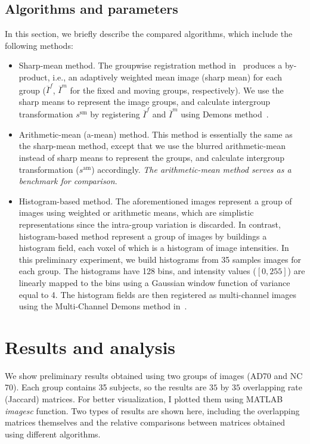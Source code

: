\documentclass[preprint,review,12pt]{elsarticle}
\newcommand{\ie}{{i.e., }}
\begin{document}
\subsection{Algorithms and parameters}
	In this section, we briefly describe the compared algorithms, which include the following methods:
	\begin{itemize}
		\item Sharp-mean method. The groupwise registration method in~\cite{Wu20111968} produces a by-product, \ie an adaptively weighted mean image (sharp mean) for each group ($\overline{I}^f$, $\overline{I}^m$ for the fixed and moving groups, respectively). We use the sharp means to represent the image groups, and calculate intergroup transformation $s^{\text{sm}}$ by registering $\overline{I}^f$ and $\overline{I}^m$ using Demons method~\cite{Vercauteren2009S61}.
		
		\item Arithmetic-mean (a-mean) method. This method is essentially the same as the sharp-mean method, except that we use the blurred arithmetic-mean instead of sharp means to represent the groups, and calculate intergroup transformation ($s^{\text{am}}$) accordingly. {\it The arithmetic-mean method serves as a benchmark for comparison}.
		
		\item Histogram-based method. The aforementioned images represent a group of images using weighted or arithmetic means, which are simplistic representations since the intra-group variation is discarded. In contrast, histogram-based method represent a group of images by buildings a histogram field, each voxel of which is a histogram of image intensities. In this preliminary experiment, we build histograms from 35 samples images for each group. The histograms have 128 bins, and intensity values ($[0,255]$) are linearly mapped to the bins using a Gaussian window function of variance equal to 4. The histogram fields are then registered as multi-channel images using the Multi-Channel Demons method in~\cite{peyrat_multichannel_demons}.
	\end{itemize}
	
\section{Results and analysis}

We show preliminary results obtained using two groups of images (AD70 and NC 70). Each group contains 35 subjects, so the results are $35$ by $35$ overlapping rate (Jaccard) matrices. For better visualization, I plotted them using MATLAB {\it imagesc} function. Two types of results are shown here, including the overlapping matrices themselves and the relative comparisons between matrices obtained using different algorithms. 
\end{document}

